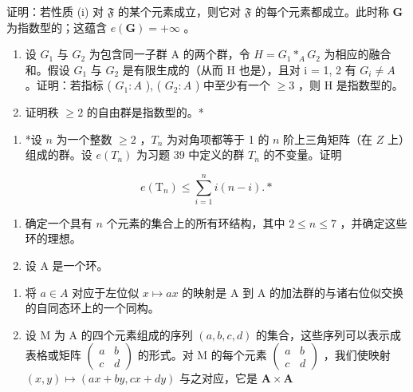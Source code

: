 证明：若性质 (i) 对 \(\mathfrak{F}\) 的某个元素成立，则它对 \(\mathfrak{F}\) 的每个元素都成立。此时称 \(\mathbf{G}\) 为指数型的；这蕴含 \(e(\mathbf{G}) = +\infty\) 。

\begin{enumerate}
\def\labelenumi{(\alph{enumi})}
\setcounter{enumi}{5}
\item
  设 \(G_{1}\) 与 \(G_{2}\) 为包含同一子群 A 的两个群，令 \(H = G_{1} *_{A} G_{2}\) 为相应的融合和。假设 \(G_{1}\) 与 \(G_{2}\) 是有限生成的（从而 H 也是），且对 i = 1, 2 有 \(G_{i} \neq A\) 。证明：若指标 ( \(G_{1}:A\) ), ( \(G_{2}:A\) ) 中至少有一个 \(\geqslant 3\) ，则 H 是指数型的。
\item
  证明秩 \(\geqslant 2\) 的自由群是指数型的。*
\end{enumerate}

\begin{enumerate}
\def\labelenumi{\arabic{enumi}.}
\setcounter{enumi}{39}
\tightlist
\item
  *设 \(n\) 为一个整数 \(\geqslant 2\) ，\(T_n\) 为对角项都等于 1 的 \(n\) 阶上三角矩阵（在 \(Z\) 上）组成的群。设 \(e(T_n)\) 为习题 39 中定义的群 \(T_n\) 的不变量。证明
\end{enumerate}

\[
e (\mathrm{T} _ {n}) \leqslant \sum_ {i = 1} ^ {n} i (n - i). *
\]

\BourbakiExercisesSection

\begin{enumerate}
\def\labelenumi{\arabic{enumi}.}
\item
  确定一个具有 \(n\) 个元素的集合上的所有环结构，其中 \(2 \leqslant n \leqslant 7\) ，并确定这些环的理想。
\item
  设 A 是一个环。
\end{enumerate}

\begin{enumerate}
\def\labelenumi{(\alph{enumi})}
\item
  将 \(a \in A\) 对应于左位似 \(x \mapsto ax\) 的映射是 A 到 A 的加法群的与诸右位似交换的自同态环上的一个同构。
\item
  设 M 为 A 的四个元素组成的序列 \((a, b, c, d)\) 的集合，这些序列可以表示成表格或矩阵 \(\begin{pmatrix} a & b \\ c & d \end{pmatrix}\) 的形式。对 M 的每个元素 \(\begin{pmatrix} a & b \\ c & d \end{pmatrix}\) ，我们使映射 \((x, y) \mapsto (ax + by, cx + dy)\) 与之对应，它是 \(\mathbf{A} \times \mathbf{A}\)
\end{enumerate}

